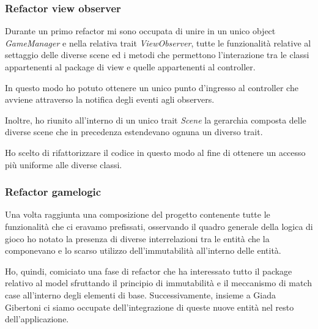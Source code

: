\subsubsection{Refactor view observer}

Durante un primo refactor mi sono occupata di unire in un unico object \textit{GameManager} e nella relativa trait \textit{ViewObserver}, tutte le funzionalità relative al settaggio delle diverse scene ed i metodi che permettono l'interazione tra le classi appartenenti al package di view e quelle appartenenti al controller. 

In questo modo ho potuto ottenere un unico punto d'ingresso al controller che avviene attraverso la notifica degli eventi agli observers.

Inoltre, ho riunito all'interno di un unico trait \textit{Scene} la gerarchia composta delle diverse scene che in precedenza estendevano ognuna un diverso trait.

Ho scelto di rifattorizzare il codice in questo modo al fine di ottenere un accesso più uniforme alle diverse classi.

\subsubsection{Refactor gamelogic}

Una volta raggiunta una composizione del progetto contenente tutte le funzionalità che ci eravamo prefissati, osservando il quadro generale della logica di gioco ho notato la presenza di diverse interrelazioni tra le entità che la componevano e lo scarso utilizzo dell'immutabilità all'interno delle entità.

Ho, quindi, comiciato una fase di refactor che ha interessato tutto il package relativo al model sfruttando il principio di immutabilità e il meccanismo di match case all'interno degli elementi di base. Successivamente, insieme a Giada Gibertoni ci siamo occupate dell'integrazione di queste nuove entità nel resto dell'applicazione.

